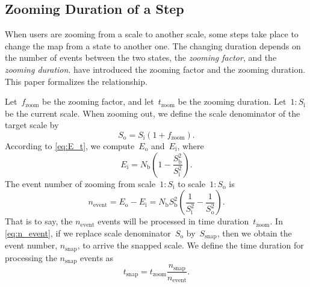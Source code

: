 \documentclass[ijgi,article,submit,moreauthors,pdftex]{Definitions/mdpi}
\begin{document}



\subsection{Zooming Duration of a Step}
\label{sec:zooming_duration}

When users are zooming from a scale to another scale,
some steps take place to change the map from a state to another one.
The changing duration depends on the number of events between the two states,
the \emph{zooming factor}, and the \emph{zooming duration}.
\citet[][]{Meijers2020Web} 
have introduced the zooming factor and the zooming duration.
This paper formalizes the relationship.

Let~$f_\mathrm{zoom}$ be the zooming factor, and 
let~$t_\mathrm{zoom}$ be the zooming duration.
Let~$1:S_\mathrm{i}$ be the current scale.
When zooming out, we define the scale denominator of the target scale by
\begin{equation}
\label{eq:S_o}
S_\mathrm{o} = S_\mathrm{i} (1 + f_\mathrm{zoom}).
\end{equation}
According to \eq\ref{eq:E_t}, we compute~$E_\mathrm{o}$ and~$E_\mathrm{i}$, where
\begin{equation*}
\label{eq:E_i}
E_\mathrm{i} = N_\mathrm{b} \left(1-\frac{S^2_\mathrm{b}}{S^2_\mathrm{i}}\right).
\end{equation*}
The event number of zooming from scale~$1:S_\mathrm{i}$ to scale~$1:S_\mathrm{o}$ is
\begin{equation}
\label{eq:n_event}
n_\mathrm{event} 
= E_\mathrm{o} - E_\mathrm{i}
= N_\mathrm{b} S^2_\mathrm{b} \left(\frac{1}{S^2_\mathrm{i}} - \frac{1}{S^2_\mathrm{o}}\right).
\end{equation}
That is to say, the $n_\mathrm{event}$ events will be processed in time duration~$t_\mathrm{zoom}$.
In \eq\ref{eq:n_event}, if we replace scale denominator~$S_\mathrm{o}$ by~$S_\mathrm{snap}$,
then we obtain the event number, $n_\mathrm{snap}$, to arrive the snapped scale.
We define the time duration for processing the $n_\mathrm{snap}$ events as
\begin{equation*}
t_\mathrm{snap}= t_\mathrm{zoom} \frac{n_\mathrm{snap}}{n_\mathrm{event}}.
\end{equation*}
\end{document}

